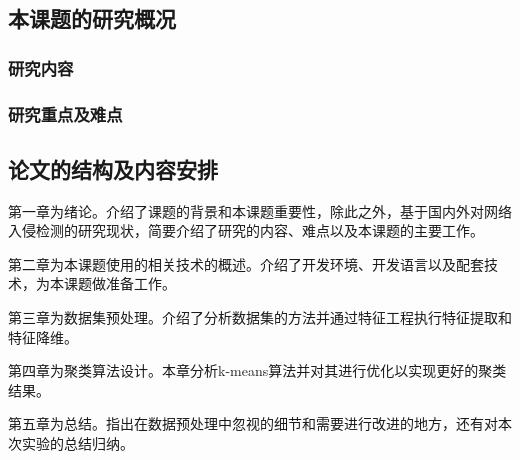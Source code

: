 \subsection{本课题的研究概况}
\subsubsection{研究内容}
\subsubsection{研究重点及难点}


\subsection{论文的结构及内容安排}
第一章为绪论。介绍了课题的背景和本课题重要性，除此之外，基于国内外对网络入侵检测的研究现状，简要介绍了研究的内容、难点以及本课题的主要工作。

第二章为本课题使用的相关技术的概述。介绍了开发环境、开发语言以及配套技术，为本课题做准备工作。

第三章为数据集预处理。介绍了分析数据集的方法并通过特征工程执行特征提取和特征降维。

第四章为聚类算法设计。本章分析k-means算法并对其进行优化以实现更好的聚类结果。

第五章为总结。指出在数据预处理中忽视的细节和需要进行改进的地方，还有对本次实验的总结归纳。


\setcounter{table}{0}
\setcounter{figure}{0}
\setcounter{equation}{0}








